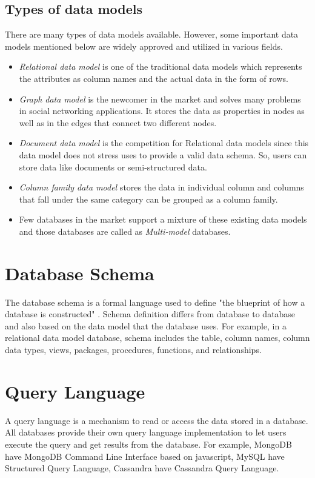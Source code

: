     \subsection{Types of data models}
     There are many types of data models available. However, some important data models mentioned below are widely approved and utilized in various fields.
    \begin{itemize}
    	\item \emph{Relational data model} is one of the traditional data models which represents the attributes as column names and the actual data in the form of rows.
    	\item \emph{Graph data model} is the newcomer in the market and solves many problems in social networking applications. It stores the data as properties in nodes as well as in the edges that connect two different nodes.
    	\item \emph{Document data model} is the competition for Relational data models since this data model does not stress uses to provide a valid data schema. So, users can store data like documents or semi-structured data. 
    	\item \emph{Column family data model} stores the data in individual column and columns that fall under the same category can be grouped as a column family.  
    	\item Few databases in the market support a mixture of these existing data models and those databases are called as \emph{Multi-model} databases.
    \end{itemize}
	
	\section{Database Schema}
	The database schema is a formal language used to define "the blueprint of how a database is constructed" \cite{misc09}. Schema definition differs from database to database and also based on the data model that the database uses. For example, in a relational data model database, schema includes the table, column names, column data types, views, packages, procedures, functions, and relationships. 

	\section{Query Language}
	A query language is a mechanism to read or access the data stored in a database.  All databases provide their own query language implementation to let users execute the query and get results from the database. For example, MongoDB have MongoDB Command Line Interface based on javascript, MySQL have Structured Query Language, Cassandra have Cassandra Query Language.
	
